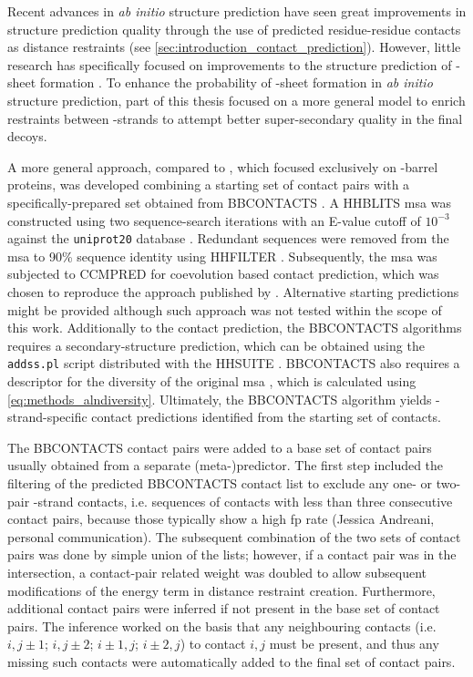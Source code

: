 Recent advances in \textit{ab initio} structure prediction have seen great improvements in structure prediction quality through the use of predicted residue-residue contacts as distance restraints (see \cref{sec:introduction_contact_prediction}). However, little research has specifically focused on improvements to the structure prediction of \textbeta-sheet formation \cite{Hayat2015-ut}. To enhance the probability of \textbeta-sheet formation in \textit{ab initio} structure prediction, part of this thesis focused on a more general model to enrich restraints between \textbeta-strands to attempt better super-secondary quality in the final decoys.

A more general approach, compared to \textcite{Hayat2015-ut}, which focused exclusively on \textbeta-barrel proteins, was developed combining a starting set of contact pairs with a specifically-prepared set obtained from BBCONTACTS \cite{Andreani2015-qn}. A HHBLITS \cite{Remmert2011-kt} \gls{msa} was constructed using two sequence-search iterations with an E-value cutoff of $10^{-3}$ against the \texttt{uniprot20} database \cite{Bateman2017-pb}. Redundant sequences were removed from the \gls{msa} to 90\% sequence identity using HHFILTER \cite{Remmert2011-kt}. Subsequently, the \gls{msa} was subjected to CCMPRED \cite{Seemayer2014-zp} for coevolution based contact prediction, which was chosen to reproduce the approach published by \textcite{Andreani2015-qn}. Alternative starting predictions might be provided although such approach was not tested within the scope of this work. Additionally to the contact prediction, the BBCONTACTS algorithms requires a secondary-structure prediction, which can be obtained using the \texttt{addss.pl} script \cite{Remmert2011-kt} distributed with the HHSUITE \cite{Soding2005-hw}. BBCONTACTS also requires a descriptor for the diversity of the original \gls{msa} \cite{Andreani2015-qn}, which is calculated using \cref{eq:methods_alndiversity}. Ultimately, the BBCONTACTS algorithm yields \textbeta-strand-specific contact predictions identified from the starting set of contacts.

The BBCONTACTS contact pairs were added to a base set of contact pairs usually obtained from a separate (meta-)predictor. The first step included the filtering of the predicted BBCONTACTS contact list to exclude any one- or two-pair \textbeta-strand contacts, i.e. sequences of contacts with less than three consecutive contact pairs, because those typically show a high \gls{fp} rate (Jessica Andreani, personal communication). The subsequent combination of the two sets of contact pairs was done by simple union of the lists; however, if a contact pair was in the intersection, a contact-pair related weight was doubled to allow subsequent modifications of the energy term in distance restraint creation. Furthermore, additional contact pairs were inferred if not present in the base set of contact pairs. The inference worked on the basis that any neighbouring contacts (i.e. $i,j\pm1$; $i,j\pm2$; $i\pm  1,j$; $i\pm2,j$) to contact $i,j$ must be present, and thus any missing such contacts were automatically added to the final set of contact pairs. 

